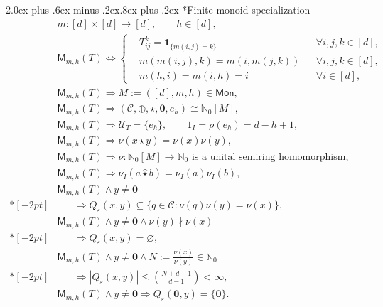 \documentclass[10pt,a5paper]{article}
\makeatletter
\renewcommand\section{\@startsection{section}{1}{\z@}%
  {2.0ex plus .6ex minus .2ex}{.8ex plus .2ex}%
  {\normalfont\large\bfseries}}
\makeatother
\begin{document}
\section*{Finite monoid specialization}
\begin{align*}
&m:[d]\times[d]\longrightarrow[d],
\qquad
h\in[d],
\\
&\mathsf M_{m,h}(T)
\iff
\left\{
\begin{aligned}
&T_{ij}^{k}
=
\mathbf1_{\{m(i,j)=k\}}
&&\forall i,j,k\in[d],
\\
&m(m(i,j),k)=m(i,m(j,k))
&&\forall i,j,k\in[d],
\\
&m(h,i)=m(i,h)=i
&&\forall i\in[d],
\end{aligned}
\right.
\\
&\mathsf M_{m,h}(T)
\Longrightarrow
M:=([d],m,h)\in\mathsf{Mon},
\\
&\mathsf M_{m,h}(T)
\Longrightarrow
(\mathcal C,\oplus,\star,\mathbf0,e_h)
\cong
\mathbb N_0[M],
\\
&\mathsf M_{m,h}(T)
\Longrightarrow
\mathcal U_T=\{e_h\},
\qquad
1_I=\rho(e_h)=d-h+1,
\\
&\mathsf M_{m,h}(T)
\Longrightarrow
\nu(x\star y)=\nu(x)\nu(y),
\\
&\mathsf M_{m,h}(T)
\Longrightarrow
\nu:\mathbb N_0[M]\longrightarrow\mathbb N_0
\text{ is a unital semiring homomorphism},
\\
&\mathsf M_{m,h}(T)
\Longrightarrow
\nu_I(a\widehat\star b)=\nu_I(a)\nu_I(b),
\\
&\mathsf M_{m,h}(T)\land y\neq\mathbf0
\\*[-2pt]
&\hspace{20pt}\Longrightarrow
Q_{\varepsilon}(x,y)
\subseteq
\{q\in\mathcal C:\nu(q)\nu(y)=\nu(x)\},
\\
&\mathsf M_{m,h}(T)\land y\neq\mathbf0
\land \nu(y)\nmid\nu(x)
\\*[-2pt]
&\hspace{20pt}\Longrightarrow
Q_{\varepsilon}(x,y)=\varnothing,
\\
&\mathsf M_{m,h}(T)\land y\neq\mathbf0
\land N:=\frac{\nu(x)}{\nu(y)}\in\mathbb N_0
\\*[-2pt]
&\hspace{20pt}\Longrightarrow
|Q_{\varepsilon}(x,y)|
\leq
\binom{N+d-1}{d-1}<\infty,
\\
&\mathsf M_{m,h}(T)\land y\neq\mathbf0
\Longrightarrow
Q_{\varepsilon}(\mathbf0,y)=\{\mathbf0\}.
\end{align*}

\end{document}
